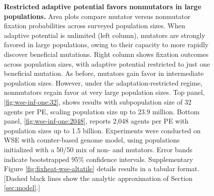 \begin{figure}[h]
\begin{minipage}{0.7\textwidth}
  \end{minipage}%
  \begin{minipage}{0.3\textwidth}
    \caption{%
      \textbf{Restricted adaptive potential favors nonmutators in large populations.}
      \footnotesize
      Area plots compare mutator versus nonmutator fixation probabilities across surveyed population sizes.
      When adaptive potential is unlimited (left column), mutators are strongly favored in large populations, owing to their capacity to more rapidly discover beneficial mutations.
      Right column shows fixation outcomes across population sizes, with adaptive potential restricted to just one beneficial mutation.
      As before, mutators gain favor in intermediate population sizes.
      However, under the adaptation-restricted regime, nonmutators regain favor at very large population sizes.
      Top panel, \ref{fig:wse-inf-one:32}, shows results with subpopulation size of 32 agents per PE, scaling population size up to 23.9 million.
      Bottom panel, \ref{fig:wse-inf-one:2048}, reports 2,048 agents per PE with population sizes up to 1.5 billion.
      Experiments were conducted on WSE with counter-based genome model, using populations initialized with a 50/50 mix of non- and mutators.
      Error bands indicate bootstrapped 95\% confidence intervals.
      Supplementary Figure \ref{fig:fixheat-wse-altatile} details results in a tabular format.
      [Dashed black lines show the analytic approximation of Section \ref{sec:model}.]
    }
    \label{fig:wse-inf-one}
  \end{minipage}
\end{figure}
